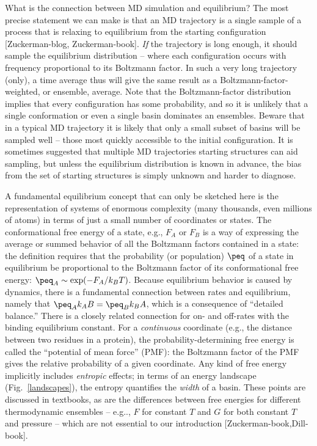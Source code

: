 \documentclass[9pt,bestpractices]{livecoms}
\begin{document}
What is the connection between MD simulation and equilibrium?  The most precise statement we can make is that an MD trajectory is a single sample of a process that is relaxing to equilibrium from the starting configuration [Zuckerman-blog, Zuckerman-book].  
\emph{If} the trajectory is long enough, it should sample the equilibrium distribution -- where each configuration occurs with frequency proportional to its Boltzmann factor.  
In such a very long trajectory (only), a time average thus will give the same result as a Boltzmann-factor-weighted, or ensemble, average.  
Note that the Boltzmann-factor distribution implies that every configuration has some probability, and so it is unlikely that a single conformation or even a single basin dominates an ensembles. 
Beware that in a typical MD trajectory it is likely that only a small subset of basins will be sampled well -- those most quickly accessible to the initial configuration.  
It is sometimes suggested that multiple MD trajectories starting structures can aid sampling, but unless the equilibrium distribution is known in advance, the bias from the set of starting structures is simply unknown and harder to diagnose.

A fundamental equilibrium concept that can only be sketched here is the representation of systems of enormous complexity (many thousands, even millions of atoms) in terms of just a small number of coordinates or states.  
The conformational free energy of a state, e.g., $F_A$ or $F_B$ is a way of expressing the average or summed behavior of all the Boltzmann factors contained in a state: the definition requires that the probability (or population) $\peq$ of a state in equilibrium be proportional to the Boltzmann factor of its conformational free energy: $\peq_A \sim \exp(-F_A/k_BT)$.  
Because equilibrium behavior is caused by dynamics, there is a fundamental connection between rates and equilibrium, namely that $\peq_A k_AB = \peq_B k_BA$, which is a consequence of “detailed balance.”  
There is a closely related connection for on- and off-rates with the binding equilibrium constant.  
For a \emph{continuous} coordinate (e.g., the distance between two residues in a protein), the probability-determining free energy is called the “potential of mean force” (PMF): the Boltzmann factor of the PMF gives the relative probability of a given coordinate.  
Any kind of free energy implicitly includes \emph{entropic} effects; in terms of an energy landscape (Fig.\ \ref{landscapes}), the entropy quantifies the \emph{width} of a basin.  
These points are discussed in textbooks, as are the differences between free energies for different thermodynamic ensembles -- e.g.., $F$ for constant $T$ and $G$ for both constant $T$ and pressure -- which are not essential to our introduction [Zuckerman-book,Dill-book].
\end{document}
